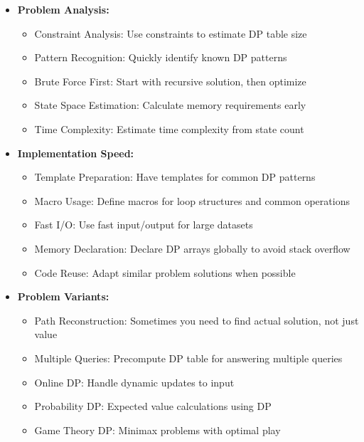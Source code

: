\documentclass[a4paper,10pt]{book}
\begin{document}
\begin{itemize}[leftmargin=*]
    \item \textbf{Problem Analysis:}
    \begin{itemize}
        \item Constraint Analysis: Use constraints to estimate DP table size
        \item Pattern Recognition: Quickly identify known DP patterns
        \item Brute Force First: Start with recursive solution, then optimize
        \item State Space Estimation: Calculate memory requirements early
        \item Time Complexity: Estimate time complexity from state count
    \end{itemize}

    \item \textbf{Implementation Speed:}
    \begin{itemize}
        \item Template Preparation: Have templates for common DP patterns
        \item Macro Usage: Define macros for loop structures and common operations
        \item Fast I/O: Use fast input/output for large datasets
        \item Memory Declaration: Declare DP arrays globally to avoid stack overflow
        \item Code Reuse: Adapt similar problem solutions when possible
    \end{itemize}

    \item \textbf{Problem Variants:}
    \begin{itemize}
        \item Path Reconstruction: Sometimes you need to find actual solution, not just value
        \item Multiple Queries: Precompute DP table for answering multiple queries
        \item Online DP: Handle dynamic updates to input
        \item Probability DP: Expected value calculations using DP
        \item Game Theory DP: Minimax problems with optimal play
    \end{itemize}
\end{itemize}
\end{document}
